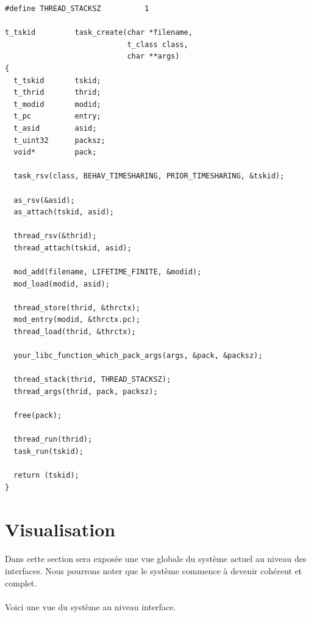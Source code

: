 \documentclass[10pt,a4wide]{article}
\begin{document}
\begin{verbatim}
#define THREAD_STACKSZ          1

t_tskid         task_create(char *filename,
                            t_class class,
                            char **args)
{
  t_tskid       tskid;
  t_thrid       thrid;
  t_modid       modid;
  t_pc          entry;
  t_asid        asid;
  t_uint32      packsz;
  void*         pack;

  task_rsv(class, BEHAV_TIMESHARING, PRIOR_TIMESHARING, &tskid);

  as_rsv(&asid);
  as_attach(tskid, asid);

  thread_rsv(&thrid);
  thread_attach(tskid, asid);

  mod_add(filename, LIFETIME_FINITE, &modid);
  mod_load(modid, asid);

  thread_store(thrid, &thrctx);
  mod_entry(modid, &thrctx.pc);
  thread_load(thrid, &thrctx);

  your_libc_function_which_pack_args(args, &pack, &packsz);

  thread_stack(thrid, THREAD_STACKSZ);
  thread_args(thrid, pack, packsz);

  free(pack);

  thread_run(thrid);
  task_run(tskid);

  return (tskid);
}
\end{verbatim}

\newpage

\section{Visualisation}

\paragraph{}

Dans cette section sera expos\'ee une vue globale du syst\`eme actuel
au niveau des interfaces. Nous pourrons noter que le syst\`eme commence
\`a devenir coh\'erent et complet.

\paragraph{}

Voici une vue du syst\`eme au niveau interface.

\paragraph{}
\end{document}
